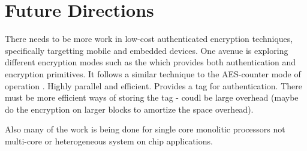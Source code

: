 \section{Future Directions}
\label{sec-conclusions}

There needs to be more work in low-cost authenticated encryption techniques,
specifically targetting mobile and embedded devices. One avenue is exploring
different encryption modes such as the  which provides
both authentication and encryption primitives. It follows a similar technique
to the AES-counter mode of operation \cite{nistGCM}. Highly parallel and
efficient. Provides a tag for authentication. There must be more efficient ways
of storing the tag - coudl be large overhead (maybe do the encryption on larger
blocks to amortize the space overhead).

Also many of the work is being done for single core monolitic processors not
multi-core or heterogeneous system on chip applications.
